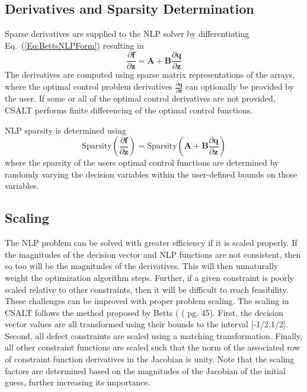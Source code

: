 \documentclass[ISTS  ]{tjsass} %
\begin{document}
\subsection{Derivatives and Sparsity Determination}

Sparse derivatives are supplied to the NLP solver by differentiating Eq.~(\ref{Eq:BettsNLPForm}) resulting in
%
\begin{equation}
\frac{\partial\mathbf{f}}{\partial\mathbf{z}} = \mathbf{A} + \mathbf{B} \frac{\partial\mathbf{q}}{\partial\mathbf{z}}   \label{Eq:BettsJacobianForm}
\end{equation}
%
The derivatives are computed using sparse matrix representations of the arrays, where the optimal control problem derivatives $\frac{\partial\mathbf{q}}{\partial\mathbf{z}}$ can optionally be provided by the user.  If some or all of the optimal control derivatives are not provided, CSALT performs finite differencing of the optimal control functions.

NLP sparsity is determined using
%
\begin{equation}
    \text{Sparsity}(\frac{\partial\mathbf{f}}{\partial\mathbf{z}}) = \text{Sparsity}(\mathbf{A} + \mathbf{B} \frac{\partial\mathbf{q}}{\partial\mathbf{z}})   \label{Eq:BettsSparsityForm}
\end{equation}
%
where the sparsity of the users optimal control functions are determined by randomly varying the decision variables within the user-defined bounds on those variables.

\subsection{Scaling}

The NLP problem can be solved with greater efficiency if it is scaled properly. If the magnitudes of the decision vector and NLP functions are not consistent, then so too will be the magnitudes of the derivatives. This will then unnaturally weight the optimization algorithm steps. Further, if a given constraint is poorly scaled relative to other constraints, then it will be difficult to reach feasibility. These challenges can be improved with proper problem scaling. The scaling in CSALT follows the method proposed by Betts ( ( pg. 45). First, the decision vector values are all transformed using their bounds to the interval [-1/2,1/2]. Second, all defect constraints are scaled using a matching transformation. Finally, all other constraint functions are scaled such that the norm of the associated row of constraint function derivatives in the Jacobian is unity. Note that the scaling factors are determined based on the magnitudes of the Jacobian of the initial guess, further increasing its importance.
\end{document}
